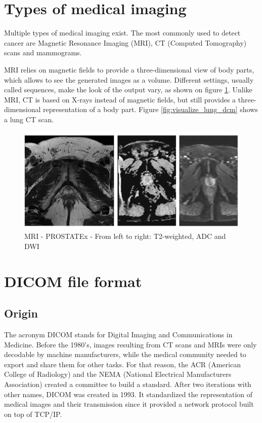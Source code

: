 \section{Types of medical imaging}
\label{sec:medical_imaging}
\setlength{\marginparwidth}{3cm}\leavevmode {}Multiple types of medical imaging exist. The most commonly used to detect cancer are Magnetic Resonance Imaging (MRI), CT (Computed Tomography) scans
and mammograms. 

MRI relies on magnetic fields to provide a three-dimensional view of body parts, which allows to see the generated images as a volume. Different settings, usually called sequences, make the look of the output vary, as shown on figure \ref{fig:PROSTATEx-t2-adc-dwi}.
Unlike MRI, CT is based on X-rays instead of magnetic fields, but still provides a three-dimensional representation of a body part. Figure \ref{fig:visualize_lung_dcm} shows a lung CT scan.

\begin{figure}[!h]
\centering
\includegraphics[width=1\textwidth, keepaspectratio=true]{./figures/PROSTATEx-t2-adc-dwi.png}
\caption{MRI - PROSTATEx - From left to right: T2-weighted, ADC and DWI}
\label{fig:PROSTATEx-t2-adc-dwi}
\end{figure}


\section{DICOM file format}
\label{sec:DICOM}
\subsection{Origin}
\setlength{\marginparwidth}{3cm}\leavevmode {}The acronym DICOM stands for Digital Imaging and Communications in Medicine. Before the 1980’s, images resulting from CT scans and MRIs were only decodable by machine manufacturers, while the medical community needed to export and share them for other tasks. For that reason, the ACR (American College of Radiology) and the NEMA (National Electrical Manufacturers Association) created a committee to build a standard. After two iterations with other names, DICOM was created in 1993. It standardized the representation of medical images and their transmission since it provided a network protocol built on top of TCP/IP.


